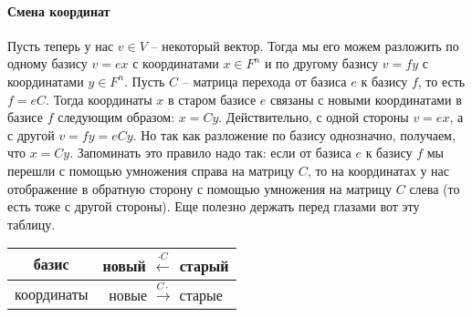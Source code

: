 \paragraph{Смена координат}

Пусть теперь у нас $v\in V$ -- некоторый вектор.
Тогда мы его можем разложить по одному базису $v = ex$ с координатами $x\in F^n$ и по другому базису $v = f y$ с координатами $y \in F^n$.
Пусть $C$ -- матрица перехода от базиса $e$ к базису $f$, то есть $f = e C$.
Тогда координаты $x$ в старом базисе $e$ связаны с новыми координатами в базисе $f$ следующим образом: $x = Cy$.
Действительно, с одной стороны $v = ex$, а с другой $v = f y = eC y$.
Но так как разложение по базису однозначно, получаем, что $x = Cy$.
Запоминать это правило надо так: если от базиса $e$ к базису $f$ мы перешли с помощью умножения справа на матрицу $C$, то на координатах у нас отображение в обратную сторону с помощью умножения на матрицу $C$ слева (то есть тоже с другой стороны).
Еще полезно держать перед глазами вот эту таблицу.
\begin{center}
\begin{tabular}{c|c}
{базис}&{новый $\stackrel{\cdot C}{\longleftarrow}$ старый}\\
\hline
{координаты}&{новые $\stackrel{C\cdot}{\longrightarrow}$ старые}\\
\end{tabular}
\end{center}
